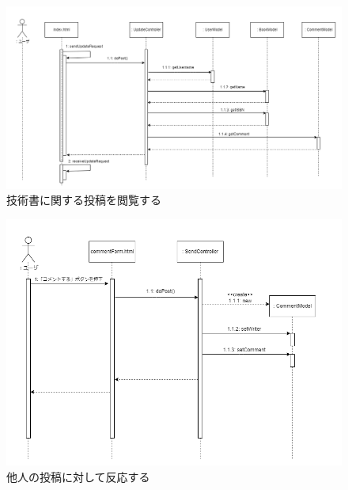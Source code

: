 \documentclass[dvipdfmx]{jsarticle}
\begin{document}
    \begin{figure}[H]
        \begin{center}
            \caption*{技術書に関する投稿を閲覧する}
            \includegraphics[scale=0.45,clip]{pictures/sequence-graph/watchMessages.png}
        \end{center}
    \end{figure}

    \begin{figure}[H]
        \begin{center}
            \caption*{他人の投稿に対して反応する}
            \includegraphics[scale=0.6,clip]{pictures/sequence-graph/reaction.png}
        \end{center}
    \end{figure}
\end{document}
